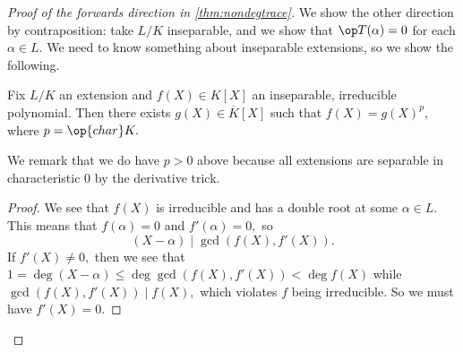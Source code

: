 \begin{proof}[Proof of the forwards direction in \autoref{thm:nondegtrace}]
	We show the other direction by contraposition: take $L/K$ inseparable, and we show that $\op T(\alpha)=0$ for each $\alpha\in L.$ We need to know something about inseparable extensions, so we show the following.
	\begin{lemma}
		Fix $L/K$ an extension and $f(X)\in K[X]$ an inseparable, irreducible polynomial. Then there exists $g(X)\in\overline K[X]$ such that $f(X)=g(X)^p,$ where $p=\op{char}K.$
	\end{lemma}
	We remark that we do have $p>0$ above because all extensions are separable in characteristic $0$ by the derivative trick.
	\begin{proof}
		We see that $f(X)$ is irreducible and has a double root at some $\alpha\in L.$ This means that $f(\alpha)=0$ and $f'(\alpha)=0,$ so
		\[(X-\alpha)\mid\gcd(f(X),f'(X)).\]
		If $f'(X)\ne0,$ then we see that $1=\deg(X-\alpha)\le\deg\gcd(f(X),f'(X))<\deg f(X)$ while $\gcd(f(X),f'(X))\mid f(X),$ which violates $f$ being irreducible. So we must have $f'(X)=0.$


\end{proof}
\end{proof}
